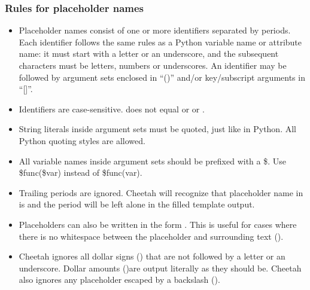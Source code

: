 \subsubsection{Rules for placeholder names}
\label{TDL.placeholders.rules}

\begin{itemize} 
     
\item Placeholder names consist of one or more identifiers separated by periods.
     Each identifier follows the same rules as a Python variable name or
     attribute name: it must start with a letter or an underscore, and the
     subsequent characters must be letters, numbers or underscores.  An
     identifier may be followed by argument sets enclosed in ``()'' and/or
     key/subscript arguments in ``[]''.

\item Identifiers are case-sensitive.  does not equal 
     or  or .     
     
\item String literals inside argument sets must be quoted, just like in Python.
     All Python quoting styles are allowed.
     
\item All variable names inside argument sets should be prefixed with a \$.  Use
     \$func(\$var) instead of \$func(var).
    
\item Trailing periods are ignored.  Cheetah will recognize that
     placeholder name in  is  and the period will
     be left alone in the filled template output.
     
\item Placeholders can also be written in the form .
     This is useful for cases where there is no whitespace between the
     placeholder and surrounding text ().
   
\item Cheetah ignores all dollar signs (\code{\$}) that are not followed by a
     letter or an underscore.  Dollar amounts ()are output
     literally as they should be.  Cheetah also ignores any placeholder escaped
     by a backslash ().

\end{itemize} 

